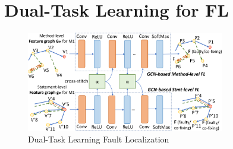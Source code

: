 \section{Dual-Task Learning for FL}
\label{sec:dual-learning}

\begin{figure}[t]
	\centering
	\includegraphics[width=3.4in]{graphs/dual-learning-3.png}
        \vspace{-18pt}
	\caption{Dual-Task Learning Fault Localization}
	\label{dual-learning}
\end{figure}




